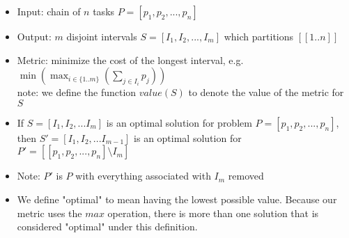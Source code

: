 \documentclass[landscape]{slides}
\begin{document}

\begin{slide} %
	\begin{itemize}
    \item Input: chain of $n$ tasks $P = [p_1, p_2, ..., p_n]$
    \item Output: $m$ disjoint intervals  $S = [I_1, I_2, ..., I_m]$ which
    			partitions $[[1..n]]$
    \item Metric: minimize the cost of the longest interval, e.g.
					$\min(\max_{i\in\{1..m\}}(\sum_{j \in{I_i}} p_j))$
					\\note: we define the function $value (S)$ to denote the value of 
					the metric for $S$
	\end{itemize}
\end{slide}

\begin{slide} %
	\begin{itemize}
	\item If $S = [I_1, I_2, ... I_m]$ is an optimal solution for problem 
	$P = [p_1, p_2, ..., p_n]$, then $S' = [I_1, I_2, ... I_{m-1}]$ is an optimal
	solution for $P' = [[p_1, p_2, ..., p_n] \setminus I_m]$
	\item Note: $P'$ is $P$ with everything associated with $I_m$ removed
	\end{itemize}
\end{slide}

\begin{slide} %
	\begin{itemize}
		\item We define "optimal" to mean having the lowest possible value. Because
		our metric uses the $max$ operation, there is more than one solution that
		is considered "optimal" under this definition.
	\end{itemize}
\end{slide}
\end{document}

